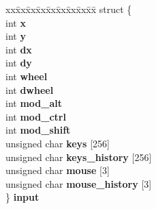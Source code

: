 \begin{DoxyCompactItemize}
\begin{tabbing}
\end{tabbing}\item 
\mbox{\label{structgaixw__context_af3f6e185424fdd693c76862a4ec187a0}} 
\begin{tabbing}
xx\=xx\=xx\=xx\=xx\=xx\=xx\=xx\=xx\=\kill
struct \{\\
int {\bfseries x}\\
int {\bfseries y}\\
int {\bfseries dx}\\
int {\bfseries dy}\\
int {\bfseries wheel}\\
int {\bfseries dwheel}\\
int {\bfseries mod\_alt}\\
int {\bfseries mod\_ctrl}\\
int {\bfseries mod\_shift}\\
unsigned char {\bfseries keys} \mbox{[}256\mbox{]}\\
unsigned char {\bfseries keys\_history} \mbox{[}256\mbox{]}\\
unsigned char {\bfseries mouse} \mbox{[}3\mbox{]}\\
unsigned char {\bfseries mouse\_history} \mbox{[}3\mbox{]}\\
\} {\bfseries input}\\


\end{tabbing}
\end{DoxyCompactItemize}
